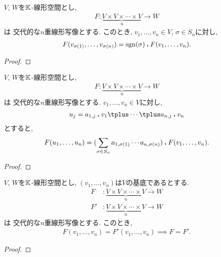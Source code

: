 \begin{prop}
  $V$, $W$を$\mathbb{K}$-線形空間とし,
  \begin{align*}
    F\colon \underbrace{V\times V\times \cdots \times V}_n\to W
  \end{align*}
  は
  交代的な$n$重線形写像とする.
  このとき, $v_1,\ldots,v_n\in V$, $\sigma\in S_n$に対し,
  \begin{align*}
    F(v_{\sigma(1)},\ldots,v_{\sigma(n)})
    =
    \operatorname{sgn}(\sigma)\mathbin{\boldsymbol{.}} F(v_1,\ldots,v_n).
  \end{align*}
\end{prop}
\begin{proof}\end{proof}

\begin{prop}
  $V$, $W$を$\mathbb{K}$-線形空間とし,
  \begin{align*}
    F\colon \underbrace{V\times V\times \cdots \times V}_n\to W
  \end{align*}
  は
  交代的な$n$重線形写像とする.
  $v_1,\ldots,v_n\in V$に対し,
  \begin{align*}
    u_j= a_{1,j}\act v_1\plus \cdots \plus a_{n,j}\act v_n
  \end{align*}
  とすると,
  \begin{align*}
    F(u_{1},\ldots,u_{n})
    =
    (\sum_{\sigma\in S_n} a_{1,\sigma(1)}\cdots a_{n,\sigma(n)})
    \mathbin{\boldsymbol{.}} F(v_1,\ldots,v_n).
  \end{align*}
\end{prop}
\begin{proof}\end{proof}

\begin{prop}
  $V$, $W$を$\mathbb{K}$-線形空間とし,
  $(v_1,\ldots,v_n)$は$V$の基底であるとする.
  \begin{align*}
    F&\colon \underbrace{V\times V\times \cdots \times V}_n\to W\\
    F'&\colon \underbrace{V\times V\times \cdots \times V}_n\to W
  \end{align*}
  は
  交代的な$n$重線形写像とする.
  このとき,
  \begin{align*}
    F(v_1,\ldots,v_n)=F'(v_1,\ldots,v_n)
    \implies
    F=F'.
  \end{align*}
\end{prop}
\begin{proof}\end{proof}

